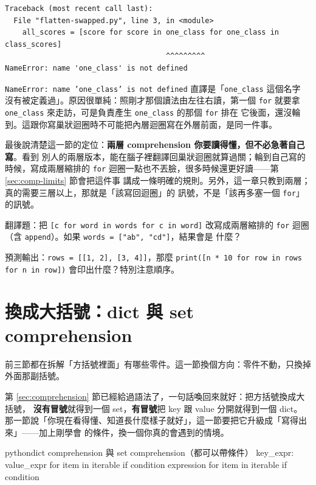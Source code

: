 \begin{verbatim}
Traceback (most recent call last):
  File "flatten-swapped.py", line 3, in <module>
    all_scores = [score for score in one_class for one_class in class_scores]
                                     ^^^^^^^^^
NameError: name 'one_class' is not defined
\end{verbatim}

\texttt{NameError: name 'one\_class' is not defined} 直譯是「\texttt{one\_class} 這個名字
沒有被定義過」。原因很單純：照剛才那個讀法由左往右讀，第一個 \texttt{for} 就要拿
\texttt{one\_class} 來走訪，可是負責產生 \texttt{one\_class} 的那個 \texttt{for} 排在
它後面，還沒輪到。這跟你寫巢狀迴圈時不可能把內層迴圈寫在外層前面，是同一件事。

最後說清楚這一節的定位：\textbf{兩層 comprehension 你要讀得懂，但不必急著自己寫}。看到
別人的兩層版本，能在腦子裡翻譯回巢狀迴圈就算過關；輪到自己寫的時候，寫成兩層縮排的
\texttt{for} 迴圈一點也不丟臉，很多時候還更好讀——第 \ref{sec:comp-limits} 節會把這件事
講成一條明確的規則。另外，這一章只教到兩層；真的需要三層以上，那就是「該寫回迴圈」的
訊號，不是「該再多塞一個 \texttt{for}」的訊號。

\begin{drills}[label=drills:comp-nested]
\item 翻譯題：把 \texttt{[c for word in words for c in word]} 改寫成兩層縮排的
\texttt{for} 迴圈（含 \texttt{append}）。如果 \texttt{words = ["ab", "cd"]}，結果會是
什麼？
\item 預測輸出：\texttt{rows = [[1, 2], [3, 4]]}，那麼
\texttt{print([n * 10 for row in rows for n in row])} 會印出什麼？特別注意順序。
\end{drills}

\section{換成大括號：dict 與 set comprehension}
\label{sec:comp-dict-set}

前三節都在拆解「方括號裡面」有哪些零件。這一節換個方向：零件不動，只換掉外面那副括號。

第 \ref{sec:comprehension} 節已經給過語法了，一句話喚回來就好：把方括號換成大括號，
\textbf{沒有冒號}就得到一個 set，\textbf{有冒號}把 key 跟 value 分開就得到一個 dict。
那一節說「你現在看得懂、知道長什麼樣子就好」，這一節要把它升級成「寫得出來」——加上剛學會
的條件，換一個你真的會遇到的情境。

\begin{code}{python}{dict comprehension 與 set comprehension（都可以帶條件）}
{key_expr: value_expr for item in iterable if condition}
{expression for item in iterable if condition}
\end{code}

